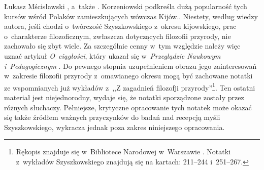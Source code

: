 \begin{artplenv}{Łukasz Mścisławski}
{%
\parencite[][]{kaminski_wyzsze_1917}, %
 a~także 
\parencite[][s.~229--236]{korzeniowski_za_2009}. %
Korzeniowski podkreśla dużą popularność tych kursów wśród Polaków zamieszkujących wówczas Kijów.}. Niestety, według wiedzy autora, jeśli chodzi o~twórczość Szyszkowskiego z~okresu kijowskiego, prac o~charakterze filozoficznym, zwłaszcza dotyczących filozofii przyrody, nie zachowało się zbyt wiele. Za szczególnie cenny w~tym względzie należy więc uznać artykuł \textit{O~ciągłości}, który ukazał się w~\textit{Przeglądzie Naukowym i~Pedagogicznym} 
\parencite[][]{szyszkowski_o_1916}. %
 Do pewnego stopnia uzupełnieniem obrazu jego zainteresowań w~zakresie filozofii przyrody z~omawianego okresu mogą być zachowane notatki ze wspomnianych już wykładów z~,,Z zagadnień filozofji przyrody''\footnote{Rękopis znajduje się w~Bibliotece Narodowej w~Warszawie 
\parencite*[][]{noauthor_noty_1917}. %
 Notatki z~wykładów Szyszkowskiego znajdują się na kartach: 211--244 i~251--267.}. Ten ostatni materiał jest niejednorodny, wydaje się, że notatki sporządzone zostały przez różnych słuchaczy. Pełniejsze, krytyczne opracowanie tych notatek może okazać się także źródłem ważnych przyczynków do badań nad recepcją myśli Szyszkowskiego, wykracza jednak poza zakres niniejszego opracowania.


\end{artplenv}
